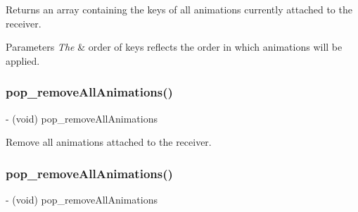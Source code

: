 Returns an array containing the keys of all animations currently attached to the receiver. 
\begin{DoxyParams}{Parameters}
{\em The} & order of keys reflects the order in which animations will be applied. \\
\hline
\end{DoxyParams}
\mbox{\label{category_n_s_object_07_p_o_p_08_a8b24200d2a40751755a930f833582296}} 
\subsubsection{\texorpdfstring{pop\+\_\+remove\+All\+Animations()}{pop\_removeAllAnimations()}\hspace{0.1cm}{\footnotesize\ttfamily [1/3]}}
{\footnotesize\ttfamily -\/ (void) pop\+\_\+remove\+All\+Animations \begin{DoxyParamCaption}{ }\end{DoxyParamCaption}}

Remove all animations attached to the receiver. \mbox{\label{category_n_s_object_07_p_o_p_08_a8b24200d2a40751755a930f833582296}} 
\subsubsection{\texorpdfstring{pop\+\_\+remove\+All\+Animations()}{pop\_removeAllAnimations()}\hspace{0.1cm}{\footnotesize\ttfamily [2/3]}}
{\footnotesize\ttfamily -\/ (void) pop\+\_\+remove\+All\+Animations \begin{DoxyParamCaption}{ }\end{DoxyParamCaption}}

